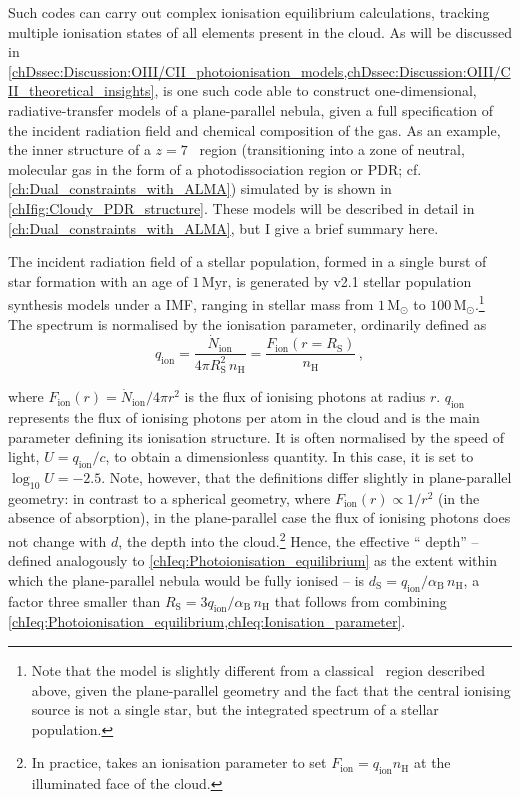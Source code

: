 Such codes can carry out complex ionisation equilibrium calculations, tracking multiple ionisation states of all elements present in the cloud. As will be discussed in \cref{chDssec:Discussion:OIII/CII_photoionisation_models,chDssec:Discussion:OIII/CII_theoretical_insights},  \citep[e.g.][]{2017RMxAA..53..385F} is one such code able to construct one-dimensional, radiative-transfer models of a plane-parallel nebula, given a full specification of the incident radiation field and chemical composition of the gas. As an example, the inner structure of a $z = 7$ \HII\ region (transitioning into a zone of neutral, molecular gas in the form of a photodissociation region or PDR; cf. \cref{ch:Dual_constraints_with_ALMA}) simulated by  is shown in \cref{chIfig:Cloudy_PDR_structure}. These models will be described in detail in \cref{ch:Dual_constraints_with_ALMA}, but I give a brief summary here.

The incident radiation field of a stellar population, formed in a single burst of star formation with an age of $1 \, \mathrm{Myr}$, is generated by  v2.1 stellar population synthesis models \citep[including binary stars;][]{2017PASA...34...58E} under a \citeauthor{1955ApJ...121..161S} IMF, ranging in stellar mass from $1 \, \mathrm{M_\odot}$ to $100 \, \mathrm{M_\odot}$.\footnote{Note that the model is slightly different from a classical \HII\ region described above, given the plane-parallel geometry and the fact that the central ionising source is not a single star, but the integrated spectrum of a stellar population.} The spectrum is normalised by the ionisation parameter, ordinarily defined as
\begin{equation}
    \label{chIeq:Ionisation_parameter}
    q_\text{ion} = \frac{\dot{N}_\text{ion}}{4 \pi R_\text{S}^2 \, n_\text{H}} = \frac{F_\text{ion} (r=R_\text{S})}{n_\text{H}} \, ,
\end{equation}

\noindent where $F_\text{ion} (r) = \dot{N}_\text{ion} / 4 \pi r^2$ is the flux of ionising photons at radius $r$. $q_\text{ion}$ represents the flux of ionising photons per atom in the cloud and is the main parameter defining its ionisation structure. It is often normalised by the speed of light, $U = q_\text{ion} / c$, to obtain a dimensionless quantity. In this case, it is set to $\log_{10} U = -2.5$. Note, however, that the definitions differ slightly in plane-parallel geometry: in contrast to a spherical geometry, where $F_\text{ion} (r) \propto 1/r^2$ (in the absence of absorption), in the plane-parallel case the flux of ionising photons does not change with $d$, the depth into the cloud.\footnote{In practice,  takes an ionisation parameter to set $F_\text{ion} = q_\text{ion} n_\text{H}$ at the illuminated face of the cloud.} Hence, the effective ``\citeauthor{1939ApJ....89..526S} depth'' -- defined analogously to \cref{chIeq:Photoionisation_equilibrium} as the extent within which the plane-parallel nebula would be fully ionised -- is $d_\text{S} = q_\text{ion}/\alpha_\text{B} \, n_\text{H}$, a factor three smaller than $R_\text{S} = 3q_\text{ion}/\alpha_\text{B} \, n_\text{H}$ that follows from combining \cref{chIeq:Photoionisation_equilibrium,chIeq:Ionisation_parameter}.

